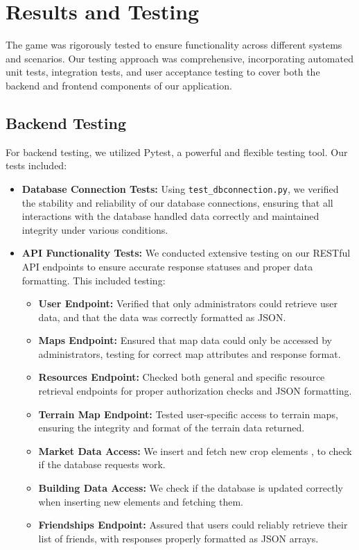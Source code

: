 \documentclass[12pt]{article}
\begin{document}
\section{Results and Testing}
The game was rigorously tested to ensure functionality across different systems and scenarios. Our testing approach was comprehensive, incorporating automated unit tests, integration tests, and user acceptance testing to cover both the backend and frontend components of our application.
\subsection{Backend Testing}
For backend testing, we utilized Pytest, a powerful and flexible testing tool. Our tests included:
\begin{itemize}
    \item \textbf{Database Connection Tests:} Using \texttt{test\_dbconnection.py}, we verified the stability and reliability of our database connections, ensuring that all interactions with the database handled data correctly and maintained integrity under various conditions.
    \item \textbf{API Functionality Tests:} We conducted extensive testing on our RESTful API endpoints to ensure accurate response statuses and proper data formatting. This included testing:
        \begin{itemize}
            \item \textbf{User Endpoint:} Verified that only administrators could retrieve user data, and that the data was correctly formatted as JSON.
            \item \textbf{Maps Endpoint:} Ensured that map data could only be accessed by administrators, testing for correct map attributes and response format.
            \item \textbf{Resources Endpoint:} Checked both general and specific resource retrieval endpoints for proper authorization checks and JSON formatting.
            \item \textbf{Terrain Map Endpoint:} Tested user-specific access to terrain maps, ensuring the integrity and format of the terrain data returned.
            \item \textbf{Market Data Access:} We insert and fetch new crop elements , to check if the database requests work.
            \item \textbf{Building Data Access:} We check if the database is updated correctly when inserting new elements and fetching them.
            \item \textbf{Friendships Endpoint:} Assured that users could reliably retrieve their list of friends, with responses properly formatted as JSON arrays.

\end{itemize}
\end{itemize}
\end{document}
